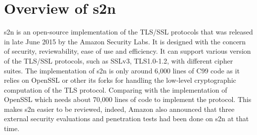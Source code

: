 

\section{Overview of s2n}
s2n \cite{3_the_s2n_user_manual, 4_introducing_s2n} is an open-source implementation of the TLS/SSL protocols that was released in late June 2015 by the Amazon Security Labs. It is designed with the concern of security, reviewability, ease of use and efficiency. It can support various version of the TLS/SSL protocols, such as SSLv3, TLS1.0-1.2, with different cipher suites. The implementation of s2n is only around 6,000 lines of C99 code as it relies on OpenSSL or other its forks for handling the low-level cryptographic computation of the TLS protocol. Comparing with the implementation of OpenSSL which needs about 70,000 lines of code to implement the protocol. This makes s2n easier to be reviewed, indeed, Amazon also announced that three external security evaluations and penetration tests had been done on s2n at that time. 


